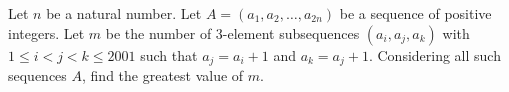 Let $n$ be a natural number. Let $A = (a_1, a_2, \ldots, a_{2n})$ be a sequence of positive integers. Let $m$ be the number of 3-element subsequences $(a_i, a_j, a_k)$ with $1 \leq i < j < k \leq 2001$ such that $a_j = a_i + 1$ and $a_k = a_j + 1$. Considering all such sequences $A$, find the greatest value of $m$.
